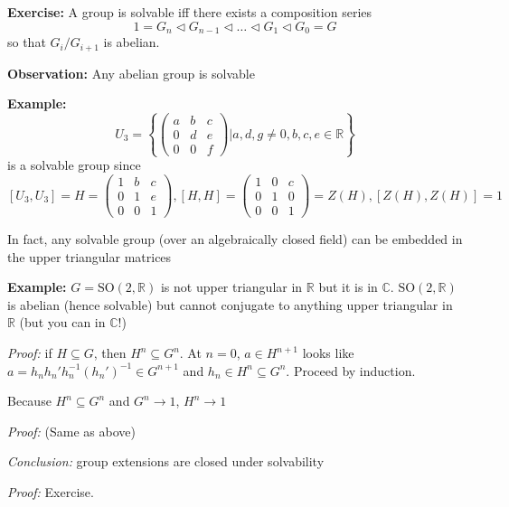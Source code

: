 \documentclass[12pt]{article}
\newcommand{\R}{\mathbb{R}}
\newcommand{\C}{\mathbb{C}}
\newcommand{\SO}{\text{SO}}
\newenvironment*{tbox}[2][gray]{
    \begin{tcolorbox}[
        parbox=false,
        colback=#1!5!white,
        colframe=#1!75!black,
        breakable,
        title={#2}
    ]}
    {\end{tcolorbox}}
\begin{document}
    \textbf{Exercise:} A group is solvable iff there exists a composition series 
    \[1 = G_n \triangleleft G_{n-1} \triangleleft \dots \triangleleft G_1 \triangleleft G_0 = G\]
    so that $G_i/G_{i+1}$ is abelian. 

    \textbf{Observation:} Any abelian group is solvable 

    \textbf{Example:} 
    \[U_3 = \left\{\begin{pmatrix}
        a & b & c\\ 
        0 & d & e\\ 
        0& 0 & f
    \end{pmatrix}\bigg\vert a, d, g \neq 0, b, c, e \in \R\right\}\] 
    is a solvable group since 
    \[[U_3, U_3] = H = \begin{pmatrix}
        1 & b & c\\ 
        0 & 1 & e\\ 
        0 & 0 & 1
    \end{pmatrix}, [H, H] = \begin{pmatrix}
        1 & 0 & c\\ 
        0 & 1 & 0\\
        0 & 0 & 1
    \end{pmatrix} = Z(H), [Z(H), Z(H)] = 1\]

    In fact, any solvable group (over an algebraically closed field) can be embedded in the upper triangular matrices 

    \textbf{Example:} $G = \SO(2, \R)$ is not upper triangular in $\R$ but it is in $\C$. $\SO(2, \R)$ is abelian (hence solvable) but cannot conjugate to anything upper triangular in $\R$ (but you can in $\C$!)

    \begin{tbox}{\textbf{Lemma:} If $H \subseteq G$ and $G$ is solvable, then $H$ is solvable}
        \emph{Proof:} if $H \subseteq G$, then $H^n \subseteq G^n$. At $n =0$, $a \in H^{n+1}$ looks like $a = h_nh_n'h_n^{-1}(h_n')^{-1} \in G^{n+1}$ and $h_n \in H^n \subseteq G^n$. Proceed by induction.
        
        Because $H^n \subseteq G^n$ and $G^n \to 1$, $H^n \to 1$ 
    \end{tbox}

    \begin{tbox}{\textbf{Lemma:} If $\phi:G \twoheadrightarrow H$ and $G$ is solvable then $H$ is solvable}
        \emph{Proof:} (Same as above)
    \end{tbox}

    \begin{tbox}{\textbf{Lemma:} If $N \hookrightarrow G \twoheadrightarrow H$, $G$ is solvable iff both $N$ and $H$ are solvable.}
        \emph{Conclusion:} group extensions are closed under solvability
        
        \emph{Proof:} Exercise. 
    \end{tbox}
\end{document}
